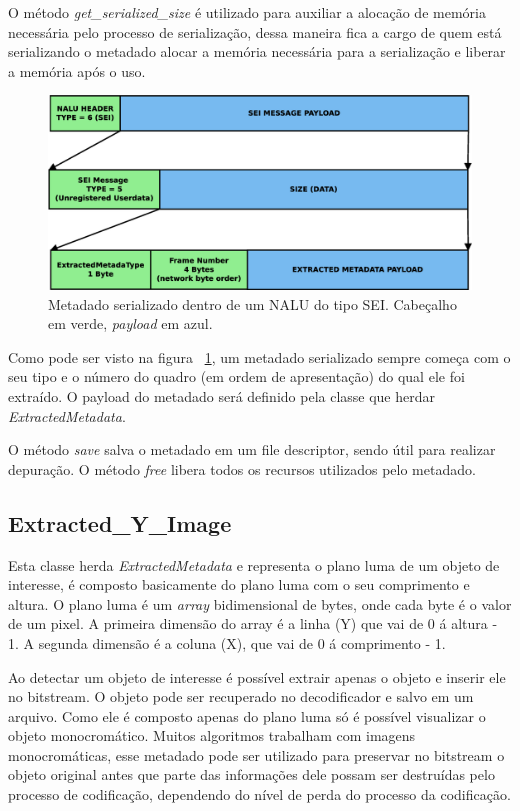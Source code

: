 O método \textit{get\_serialized\_size} é utilizado para auxiliar a alocação de memória necessária pelo processo de serialização, dessa maneira fica a cargo de quem está serializando o metadado alocar a memória necessária para a serialização e liberar a memória após o uso.

\begin{figure}[H]
\centering
\includegraphics[scale=0.4]{imagens/fig9.eps}
\caption{Metadado serializado dentro de um NALU do tipo SEI. Cabeçalho em verde, \textit{payload} em azul.}
\label{fig:extracted_metadata_on_nalu}
\end{figure}

Como pode ser visto na figura ~\ref{fig:extracted_metadata_on_nalu}, um metadado serializado sempre começa com o seu tipo e o número do quadro (em ordem de apresentação) do qual ele foi extraído. O payload do metadado será definido pela classe que herdar \textit{ExtractedMetadata}.

O método \textit{save} salva o metadado em um file descriptor, sendo útil para realizar depuração. O método \textit{free} libera todos os recursos utilizados pelo metadado.


\subsection{ Extracted\_Y\_Image }


Esta classe herda \textit{ExtractedMetadata} e representa o plano luma de um objeto de interesse, é composto basicamente do plano luma com o seu comprimento e altura. O plano luma é um \textit{array} bidimensional de bytes, onde cada byte é o valor de um pixel. A primeira dimensão do array é a linha (Y) que vai de 0 á altura - 1. A segunda dimensão é a coluna (X), que vai de 0 á comprimento - 1.

Ao detectar um objeto de interesse é possível extrair apenas o objeto e inserir ele no bitstream. O objeto pode ser recuperado no decodificador e salvo em um arquivo. Como ele é composto apenas do plano luma só é possível visualizar o objeto monocromático. Muitos algoritmos trabalham com imagens monocromáticas, esse metadado pode ser utilizado para preservar no bitstream o objeto original antes que parte das informações dele possam ser destruídas pelo processo de codificação, dependendo do nível de perda do processo da codificação. 

